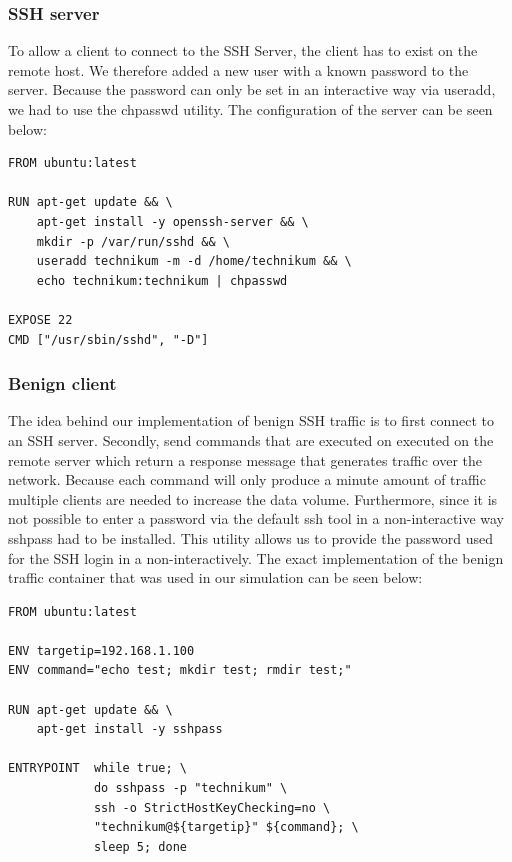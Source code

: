 \documentclass[conference]{IEEEtran}
\begin{document}
\subsubsection{SSH server}
To allow a client to connect to the SSH Server, the client has to exist on the remote host. We therefore added a new user with a known password to the server. Because the password can only be set in an interactive way via useradd, we had to use the chpasswd utility. 
The configuration of the server can be seen below: 

\begin{lstlisting}[basicstyle=\footnotesize]
FROM ubuntu:latest

RUN apt-get update && \ 
    apt-get install -y openssh-server && \
    mkdir -p /var/run/sshd && \
    useradd technikum -m -d /home/technikum && \
    echo technikum:technikum | chpasswd

EXPOSE 22
CMD ["/usr/sbin/sshd", "-D"]
\end{lstlisting}

\subsubsection{Benign client}
The idea behind our implementation of benign SSH traffic is to first connect to an SSH server. Secondly, send commands that are executed on executed on the remote server which return a response message that generates traffic over the network. Because each command will only produce a minute amount of traffic multiple clients are needed to increase the data volume. Furthermore, since it is not possible to enter a password via the default ssh tool in a non-interactive way sshpass had to be installed. This utility allows us to provide the password used for the SSH login in a non-interactively. The exact implementation of the benign traffic container that was used in our simulation can be seen below:

\begin{lstlisting}[basicstyle=\footnotesize]
FROM ubuntu:latest

ENV targetip=192.168.1.100
ENV command="echo test; mkdir test; rmdir test;"

RUN apt-get update && \ 
    apt-get install -y sshpass
    
ENTRYPOINT  while true; \
            do sshpass -p "technikum" \
            ssh -o StrictHostKeyChecking=no \ 
            "technikum@${targetip}" ${command}; \
            sleep 5; done
\end{lstlisting}
\end{document}

